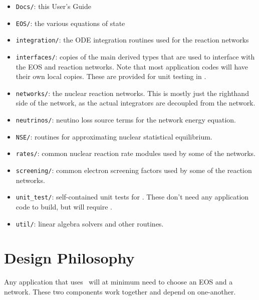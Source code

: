 \begin{itemize}
\item {\tt Docs/}: this User's Guide

\item {\tt EOS/}: the various equations of state

\item {\tt integration/}: the ODE integration routines used for the
  reaction networks

\item {\tt interfaces/}: copies of the main derived types that are used to
  interface with the EOS and reaction networks.  Note that most application
  codes will have their own local copies.  These are provided for unit testing
  in \microphysics.

\item {\tt networks/}: the nuclear reaction networks.  This is mostly just the
  righthand side of the network, as the actual integrators are decoupled from
  the network.

\item {\tt neutrinos/}: neutino loss source terms for the network energy equation.

\item {\tt NSE/}: routines for approximating nuclear statistical equilibrium.

\item {\tt rates/}: common nuclear reaction rate modules used by some of the 
  networks.

\item {\tt screening/}: common electron screening factors used by some of the 
  reaction networks.

\item {\tt unit\_test/}: self-contained unit tests for \microphysics.  These don't
  need any application code to build, but will require \boxlib.

\item {\tt util/}: linear algebra solvers and other routines.

\end{itemize}



\section{Design Philosophy}

Any application that uses \microphysics\ will at minimum need to
choose an EOS and a network.  These two components work together and
depend on one-another.  

